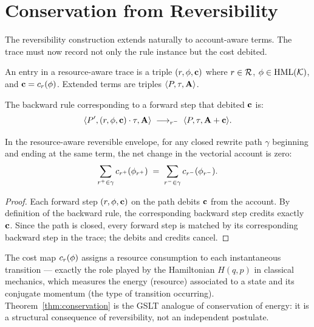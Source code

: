 \section{Conservation from Reversibility}

The reversibility construction extends naturally to account-aware terms.
The trace must now record not only the rule instance but the cost debited.

\begin{definition}
An entry in a resource-aware trace is a triple $(r, \phi, \mathbf{c})$ where
$r \in \mathcal{R}$, $\phi \in \mathrm{HML}(\mathcal{K})$, and $\mathbf{c} = c_r(\phi)$.
Extended terms are triples $\langle P, \tau, \mathbf{A} \rangle$.
\end{definition}

\begin{definition}
The backward rule corresponding to a forward step that debited $\mathbf{c}$ is:
\[
  \langle P', (r, \phi, \mathbf{c}) \cdot \tau, \mathbf{A} \rangle
  \;\longrightarrow_{r^-}\;
  \langle P, \tau, \mathbf{A} + \mathbf{c} \rangle.
\]
\end{definition}

\begin{theorem}
\label{thm:conservation}
In the resource-aware reversible envelope, for any closed rewrite path
$\gamma$ beginning and ending at the same term, the net change in the
vectorial account is zero:
\[
  \sum_{r^+ \in \gamma} c_{r^+}(\phi_{r^+}) \;=\;
  \sum_{r^- \in \gamma} c_{r^-}(\phi_{r^-}).
\]
\end{theorem}

\begin{proof}
Each forward step $(r, \phi, \mathbf{c})$ on the path debits $\mathbf{c}$ from the
account.  By definition of the backward rule, the corresponding backward step
credits exactly $\mathbf{c}$.  Since the path is closed, every forward step is
matched by its corresponding backward step in the trace; the debits and credits
cancel.
\end{proof}

\begin{remark}
The cost map $c_r(\phi)$ assigns a resource consumption to each
instantaneous transition --- exactly the role played by the Hamiltonian $H(q,p)$
in classical mechanics, which measures the energy (resource) associated to a
state and its conjugate momentum (the type of transition occurring).
Theorem~\ref{thm:conservation} is the GSLT analogue of conservation of energy:
it is a structural consequence of reversibility, not an independent postulate.
\end{remark}

